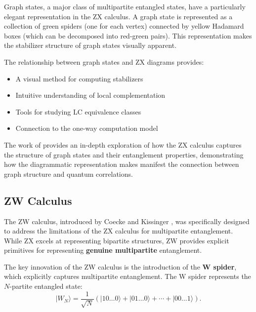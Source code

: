 \documentclass[%
 amsmath,amssymb,
 aps,
rmp,
]{revtex4-2}
\begin{document}
Graph states, a major class of multipartite entangled states, have a particularly elegant representation in the ZX calculus. A graph state is represented as a collection of green spiders (one for each vertex) connected by yellow Hadamard boxes (which can be decomposed into red-green pairs). This representation makes the stabilizer structure of graph states visually apparent.

The relationship between graph states and ZX diagrams provides:
\begin{itemize}
	\item A visual method for computing stabilizers
	\item Intuitive understanding of local complementation
	\item Tools for studying LC equivalence classes
	\item Connection to the one-way computation model
\end{itemize}

The work of \cite{cqm} provides an in-depth exploration of how the ZX calculus captures the structure of graph states and their entanglement properties, demonstrating how the diagrammatic representation makes manifest the connection between graph structure and quantum correlations.









\subsection{ZW Calculus}
\label{sec:zw}

The ZW calculus, introduced by Coecke and Kissinger \cite{zw-calculus,zw-phd}, was specifically designed to address the limitations of the ZX calculus for multipartite entanglement. While ZX excels at representing bipartite structures, ZW provides explicit primitives for representing \textbf{genuine multipartite} entanglement.

The key innovation of the ZW calculus is the introduction of the \textbf{W spider}, which explicitly captures multipartite entanglement. The W spider represents the $N$-partite entangled state:
\begin{equation}
	|W_N\rangle = \frac{1}{\sqrt{N}}(|10\ldots 0\rangle + |01\ldots 0\rangle + \cdots + |00\ldots 1\rangle).
\end{equation}
\end{document}
